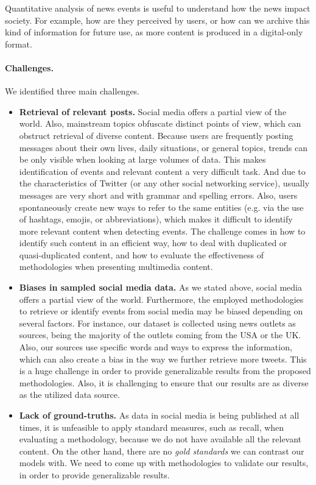 \documentclass[runningheads]{llncs}
\begin{document}
Quantitative analysis of news events is useful to understand how the news impact
society. For example, how are they perceived by users, or how can we archive
this kind of information for future use, as more content is produced in a
digital-only format.

\paragraph{Challenges.} We identified three main challenges.

\begin{itemize}
    \item {\bf Retrieval of relevant posts.} 
    Social media offers a partial view of the world. 
    Also, mainstream topics obfuscate distinct points of view, which can
    obstruct retrieval of diverse content. 
    Because users are frequently posting messages about their own lives, daily
    situations, or general topics, trends can be only visible when looking at large
    volumes of data. 
    This makes identification of events and relevant content a very difficult task.
    And due to the characteristics of Twitter (or any other social networking
    service), usually messages are very short and with grammar and spelling
    errors. 
    Also, users spontaneously create new ways to refer to the same entities
    (e.g. via the use of hashtags, emojis, or abbreviations), which makes it
    difficult to identify more relevant content when detecting events.
    The challenge comes in how to identify such content in an efficient way, how
    to deal with duplicated or quasi-duplicated content, and how to evaluate the
    effectiveness of methodologies when presenting multimedia content. 

    \item {\bf Biases in sampled social media data.}
    As we stated above, social media offers a partial view of the world. 
    Furthermore, the employed methodologies to retrieve or identify events from
    social media may be biased depending on several factors. 
    For instance, our dataset is collected using news outlets as sources, being
    the majority of the outlets coming from the USA or the UK. 
    Also, our sources use specific words and ways to express the information,
    which can also create a bias in the way we further retrieve more tweets.
    This is a huge challenge in order to provide generalizable results from the
    proposed methodologies. 
    Also, it is challenging to ensure that our results are as diverse as the
    utilized data source. 

    \item {\bf Lack of ground-truths.} 
    As data in social media is being published at all times, it is unfeasible to
    apply standard measures, such as recall, when evaluating a methodology,
    because we do not have available all the relevant content.
    On the other hand, there are no {\em gold standards} we can contrast our
    models with. 
    We need to come up with methodologies to validate our results, in order to
    provide generalizable results.

    
\end{itemize}
\end{document}
